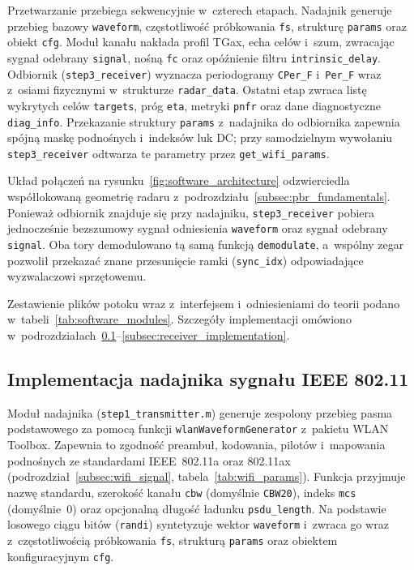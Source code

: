 Przetwarzanie przebiega sekwencyjnie w~czterech etapach. Nadajnik generuje przebieg bazowy \texttt{waveform}, częstotliwość próbkowania \texttt{fs}, strukturę \texttt{params} oraz obiekt \texttt{cfg}. Moduł kanału nakłada profil TGax, echa celów i~szum, zwracając sygnał odebrany \texttt{signal}, nośną \texttt{fc} oraz opóźnienie filtru \texttt{intrinsic\_delay}. Odbiornik (\texttt{step3\_receiver}) wyznacza periodogramy \texttt{CPer\_F} i~\texttt{Per\_F} wraz z~osiami fizycznymi w~strukturze \texttt{radar\_data}. Ostatni etap zwraca listę wykrytych celów \texttt{targets}, próg \texttt{eta}, metryki \texttt{pnfr} oraz dane diagnostyczne \texttt{diag\_info}. Przekazanie struktury \texttt{params} z~nadajnika do odbiornika zapewnia spójną maskę podnośnych i~indeksów luk DC; przy samodzielnym wywołaniu \texttt{step3\_receiver} odtwarza te parametry przez \texttt{get\_wifi\_params}.

Układ połączeń na rysunku~\ref{fig:software_architecture} odzwierciedla współlokowaną geometrię radaru z~podrozdziału~\ref{subsec:pbr_fundamentals}. Ponieważ odbiornik znajduje się przy nadajniku, \texttt{step3\_receiver} pobiera jednocześnie bezszumowy sygnał odniesienia \texttt{waveform} oraz sygnał odebrany \texttt{signal}. Oba tory demodulowano tą samą funkcją \texttt{demodulate}, a~wspólny zegar pozwolił przekazać znane przesunięcie ramki (\texttt{sync\_idx}) odpowiadające wyzwalaczowi sprzętowemu.

Zestawienie plików potoku wraz z~interfejsem i~odniesieniami do teorii podano w~tabeli~\ref{tab:software_modules}. Szczegóły implementacji omówiono w~podrozdziałach~\ref{subsec:transmitter_implementation}--\ref{subsec:receiver_implementation}.



\subsection{Implementacja nadajnika sygnału IEEE 802.11}
\label{subsec:transmitter_implementation}

Moduł nadajnika (\texttt{step1\_\allowbreak transmitter.m}) generuje zespolony przebieg pasma podstawowego za pomocą funkcji \texttt{wlanWaveform\allowbreak Generator} z~pakietu WLAN Toolbox. Zapewnia to zgodność preambuł, kodowania, pilotów i~mapowania podnośnych ze standardami IEEE~802.11a oraz 802.11ax (podrozdział~\ref{subsec:wifi_signal}, tabela~\ref{tab:wifi_params}). Funkcja przyjmuje nazwę standardu, szerokość kanału \texttt{cbw} (domyślnie \texttt{CBW20}), indeks \texttt{mcs} (domyślnie~0) oraz opcjonalną długość ładunku \texttt{psdu\_length}. Na podstawie losowego ciągu bitów (\texttt{randi}) syntetyzuje wektor \texttt{waveform} i~zwraca go wraz z~częstotliwością próbkowania \texttt{fs}, strukturą \texttt{params} oraz obiektem konfiguracyjnym \texttt{cfg}.

